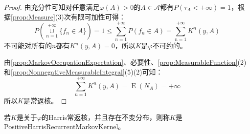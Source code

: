 \begin{proof}
	由充分性可知对任意满足$\varphi(A)>0$的$A\in\mathscr{A}$都有$P(\tau_A<+\infty)=1$，根据\cref{prop:Measure}(3)次有限可加性可得：
	\begin{equation*}
		P\left(\underset{n=1}{\overset{+\infty}{\cup}}\{f_n\in A\}\right)=1\leqslant\sum_{n=1}^{+\infty}P(f_n\in A)=\sum_{n=1}^{+\infty}K^n(y,A)
	\end{equation*}
	不可能对所有的$n$都有$K^n(y,A)=0$，所以$K$是$\varphi$不可约的。\par
	由\cref{prop:MarkovOccupationExpectation}、必要性、\cref{prop:MeasurableFunction}(2)和\cref{prop:NonnegativeMeasurableIntegral}(5)(2)可知：
	\begin{equation*}
		\sum_{n=1}^{+\infty}K^n(y,A)=\operatorname{E}(N_A)=+\infty
	\end{equation*}
	所以$K$是常返核。
\end{proof}
\begin{definition}
	若$K$是关于$\varphi$的Harris常返核，并且存在不变分布，则称$K$是\gls{PositiveHarrisRecurrentMarkovKernel}。
\end{definition}
